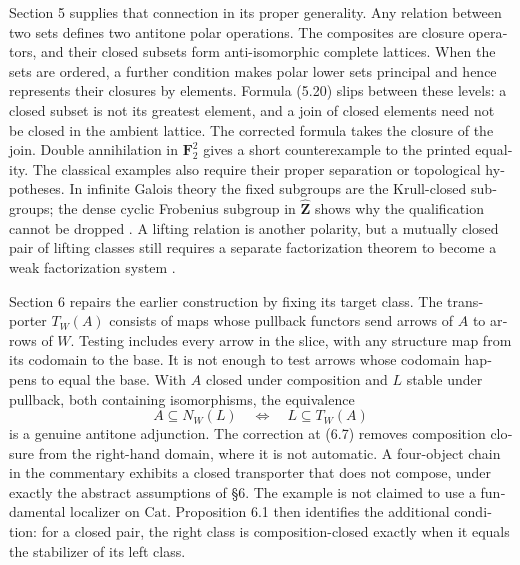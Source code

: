 \begin{otherlanguage}{english}
Section 5 supplies that connection in its proper generality. Any relation
between two sets defines two antitone polar operations. The composites are
closure operators, and their closed subsets form anti-isomorphic complete
lattices. When the sets are ordered, a further condition makes polar lower
sets principal and hence represents their closures by elements. Formula
(5.20) slips between these levels: a closed subset is not its greatest
element, and a join of closed elements need not be closed in the ambient
lattice. The corrected formula takes the closure of the join. Double
annihilation in $\mathbf F_2^2$ gives a short counterexample to the printed
equality. The classical examples also require their proper separation or
topological hypotheses. In infinite Galois theory the fixed subgroups are
the Krull-closed subgroups; the dense cyclic Frobenius subgroup in
$\widehat{\mathbf Z}$ shows why the qualification cannot be dropped
\citep[Proposition 7.12 and Theorem 7.13]{Milne2022FT}. A lifting relation is
another polarity, but a mutually closed pair of lifting classes still
requires a separate factorization theorem to become a weak factorization
system \citep[Definition 11.2.1]{Riehl2014}.

Section 6 repairs the earlier construction by fixing its target class.
The transporter $T_W(A)$ consists of maps whose pullback functors send
arrows of $A$ to arrows of $W$. Testing includes every arrow in the slice,
with any structure map from its codomain to the base. It is not enough to
test arrows whose codomain happens to equal the base. With $A$ closed under
composition and $L$ stable under pullback, both containing isomorphisms,
the equivalence
\[
 A\subseteq N_W(L)\quad\Longleftrightarrow\quad L\subseteq T_W(A)
\]
is a genuine antitone adjunction. The correction at (6.7) removes
composition closure from the right-hand domain, where it is not automatic.
A four-object chain in the commentary exhibits a closed transporter that
does not compose, under exactly the abstract assumptions of \S6. The
example is not claimed to use a fundamental localizer on $\mathrm{Cat}$.
Proposition 6.1 then identifies the additional condition: for a closed pair,
the right class is composition-closed exactly when it equals the stabilizer
of its left class.


\end{otherlanguage}
